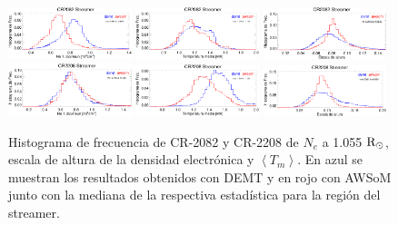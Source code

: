 \documentclass[baaa]{baaa}
\begin{document}
\begin{figure}
  \centering
  \includegraphics[width=0.32\textwidth]{figuras/proceeding_2082_demt_awsom_streamer_ne_1055.eps}
  \includegraphics[width=0.32\textwidth]{figuras/proceeding_2082_demt_awsom_streamer_Tm.eps}
  \includegraphics[width=0.32\textwidth]{figuras/proceeding_2082_demt_awsom_streamer_lambda_n.eps}\\
  \includegraphics[width=0.32\textwidth]{figuras/proceeding_2208_demt_awsom_streamer_ne_1055.eps}
  \includegraphics[width=0.32\textwidth]{figuras/proceeding_2208_demt_awsom_streamer_Tm.eps}
  \includegraphics[width=0.32\textwidth]{figuras/proceeding_2208_demt_awsom_streamer_lambda_n.eps}
  \caption{Histograma de frecuencia de CR-2082 y CR-2208 de $N_e$ a 1.055 ${\rm R_\odot}$, escala de altura de la densidad electrónica y $\left<T_m\right>$. En azul se muestran los resultados obtenidos con DEMT y en rojo con AWSoM junto con la mediana de la respectiva estadística para la región del streamer.}
  \label{fig-histos}
\end{figure}
\end{document}
